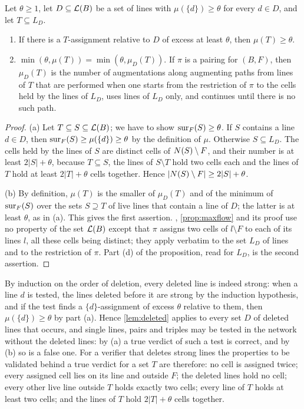 \begin{lemma}\label{lem:deleted}
Let $\theta\ge 1$, let $D\subseteq\mathcal{L}(B)$ be a set of lines with $\mu(\{d\})\ge\theta$ for every
$d\in D$, and let $T\subseteq L_D$.
\begin{enumerate}[label=\textup{(\alph*)}]
\item If there is a $T$-assignment relative to $D$ of excess at least $\theta$, then $\mu(T)\ge\theta$.
\item $\min(\theta,\mu(T))=\min(\theta,\mu_D(T))$. If $\pi$ is a pairing for $(B,F)$, then $\mu_D(T)$ is
      the number of augmentations along augmenting paths from lines of $T$ that are performed when one
      starts from the restriction of $\pi$ to the cells held by the lines of $L_D$, uses lines of $L_D$
      only, and continues until there is no such path.
\end{enumerate}
\end{lemma}

\begin{proof}
(a) Let $T\subseteq S\subseteq\mathcal{L}(B)$; we have to show $\operatorname{sur}_F(S)\ge\theta$. If $S$ contains a line
$d\in D$, then $\operatorname{sur}_F(S)\ge\mu(\{d\})\ge\theta$ by the definition of $\mu$. Otherwise $S\subseteq L_D$.
The cells held by the lines of $S$ are distinct cells of $N(S)\setminus F$, and their number is at least
$2|S|+\theta$, because $T\subseteq S$, the lines of $S\setminus T$ hold two cells each and the lines of
$T$ hold at least $2|T|+\theta$ cells together. Hence $|N(S)\setminus F|\ge 2|S|+\theta$.

(b) By definition, $\mu(T)$ is the smaller of $\mu_D(T)$ and of the minimum of $\operatorname{sur}_F(S)$ over the sets
$S\supseteq T$ of live lines that contain a line of $D$; the latter is at least $\theta$, as in (a). This
gives the first assertion. , \cref{prop:maxflow} and its proof use no property of
the set $\mathcal{L}(B)$ except that $\pi$ assigns two cells of $l\setminus F$ to each of its lines $l$, all
these cells being distinct; they apply verbatim to the set $L_D$ of lines and to the restriction of
$\pi$. Part (d) of the proposition, read for $L_D$, is the second assertion.
\end{proof}

By induction on the order of deletion, every deleted line is indeed strong: when a line $d$ is tested,
the lines deleted before it are strong by the induction hypothesis, and if the test finds a
$\{d\}$-assignment of excess $\theta$ relative to them, then $\mu(\{d\})\ge\theta$ by part (a). Hence
\cref{lem:deleted} applies to every set $D$ of deleted lines that occurs, and single lines, pairs and
triples may be tested in the network without the deleted lines: by (a) a true verdict of such a test is
correct, and by (b) so is a false one. For a verifier that deletes strong lines the properties to be
validated behind a true verdict for a set $T$ are therefore: no cell is assigned twice; every assigned
cell lies on its line and outside $F$; the deleted lines hold no cell; every other live line outside $T$
holds exactly two cells; every line of $T$ holds at least two cells; and the lines of $T$ hold
$2|T|+\theta$ cells together.

